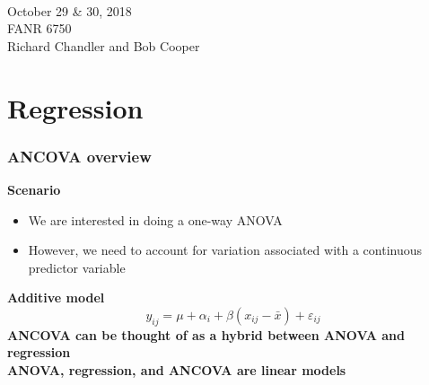 \documentclass[color=usenames,dvipsnames]{beamer}\usepackage[]{graphicx}\usepackage[]{color}
\begin{document}



\begin{frame}[plain]
  \huge
  \centering \par
  {\color{RoyalBlue}{Lab 11 -- ANCOVA}} \\
  \vspace{1cm}
  \Large
  October 29 \& 30, 2018 \\
  FANR 6750 \\
  \vfill
  \large
  Richard Chandler and Bob Cooper

\end{frame}



\section{Regression}




\begin{frame}
  \frametitle{ANCOVA overview}
  {\bf Scenario}
  \begin{itemize}
    \item We are interested in doing a one-way ANOVA
    \item However, we need to account for variation associated with a
      continuous predictor variable
  \end{itemize}
  \pause
  \vfill
  {\bf  Additive model}
  \[
    y_{ij} = \mu + \alpha_i + \beta(x_{ij} - \bar{x}) + \varepsilon_{ij}
  \]
  \pause
  \vfill
  \bf
  ANCOVA can be thought of as a hybrid between ANOVA and regression \\
  \pause
  \vfill
  \bf
  ANOVA, regression, and ANCOVA are linear models \\
\end{frame}
\end{document}
